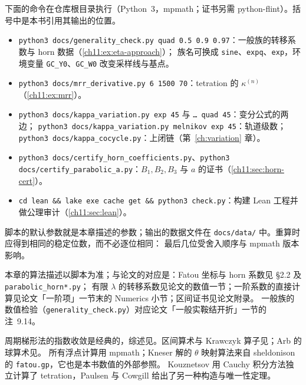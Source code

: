 下面的命令在仓库根目录执行（Python~3，mpmath；证书另需 python-flint）。括号中是本书引用其输出的位置。
{\sloppy
\begin{itemize}
\item \texttt{python3 docs/\allowbreak generality\_\allowbreak check.py quad 0.5 0.9 0.97}：一般族的转移系数与 horn 数据（\cref{ch11:ex:eta-approach}）；
  族名可换成 \texttt{sine}、\texttt{expq}、\texttt{exp}，环境变量 \texttt{GC\_Y0}、\texttt{GC\_W0} 改变采样线与基点。
\item \texttt{python3 docs/\allowbreak mrr\_\allowbreak derivative.py 6 1500 70}：tetration 的 $\kappa^{(n)}$（\cref{ch11:ex:mrr}）。
\item \texttt{python3 docs/\allowbreak kappa\_\allowbreak variation.py exp 45} 与 \texttt{\dots\ quad 45}：变分公式的两边；
  \texttt{python3 docs/\allowbreak kappa\_\allowbreak variation.py melnikov exp 45}：轨道级数；\texttt{python3 docs/\allowbreak kappa\_\allowbreak cocycle.py}：上闭链（第~\ref{ch:variation} 章）。
\item \texttt{python3 docs/\allowbreak certify\_\allowbreak horn\_\allowbreak coefficients.py}、\texttt{python3 docs/\allowbreak certify\_\allowbreak parabolic\_\allowbreak a.py}：$B_1,B_2,B_3$ 与 $a$ 的证书（\cref{ch11:sec:horn-cert}）。
\item \texttt{cd lean \&\& lake exe cache get \&\& python3 check.py}：构建 Lean 工程并做公理审计（\cref{ch11:sec:lean}）。
\end{itemize}\par}
脚本的默认参数就是本章描述的参数；输出的数据文件在 \texttt{docs/data/} 中。重算时应得到相同的稳定位数，而不必逐位相同：
最后几位受舍入顺序与 mpmath 版本影响。

\notes

本章的算法描述以脚本为准；与论文的对应是：Fatou 坐标与 horn 系数见 \cite{KneserPaper} §2.2 及 \texttt{parabolic\_\allowbreak{}horn*.py}；
有限 $\lambda$ 的转移系数见论文的数值一节；一阶系数的直接计算见论文「一阶项」一节末的 Numerics 小节；区间证书见论文附录。
一般族的数值检验（\texttt{generality\_\allowbreak{}check.py}）对应论文「一般实鞍结开折」一节的 注~9.14。

周期梯形法的指数收敛是经典的，综述见\cite{TrefethenWeideman2014}。区间算术与 Krawczyk 算子见\cite{Neumaier1990}；Arb 的球算术见\cite{Johansson2017Arb}。
所有浮点计算用 mpmath；Kneser 解的 $\theta$ 映射算法来自 sheldonison 的 \texttt{fatou.gp}，它也是本书数值的外部参照。
Kouznetsov 用 Cauchy 积分方法独立计算了 tetration\cite{Kouznetsov2009}，Paulsen 与 Cowgill 给出了另一种构造与唯一性定理\cite{PaulsenCowgill2017}。

